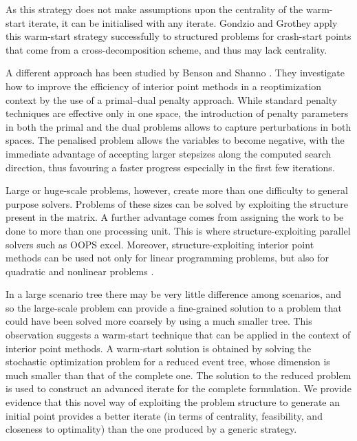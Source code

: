 {As this strategy does not make assumptions upon the centrality of the 
warm-start iterate,
it can be initialised with any iterate.
Gondzio and Grothey \cite{GondzioGrothey03} apply this warm-start 
strategy successfully to structured problems for crash-start points that 
come from a cross-decomposition scheme, and thus may lack centrality.


A different approach has been studied by Benson and Shanno 
\cite{BensonShanno}. They investigate how to improve the efficiency 
of interior point methods in a reoptimization context by the use of 
a primal--dual penalty approach.
While standard penalty techniques are effective only in one space, 
the introduction of penalty parameters in both the primal and the 
dual problems allows to capture perturbations in both spaces.
%
%
The penalised problem allows the variables to become negative, with
the immediate advantage of accepting larger stepsizes along 
the computed search direction, thus favouring a faster progress
especially in the first few iterations.


\hrulefill


Large or huge-scale problems, however, create more than one difficulty 
to general purpose solvers. Problems of these sizes can be solved by 
exploiting the structure present in the matrix. A further advantage 
comes from assigning the work to be done to more than one processing unit. 
This is where structure-exploiting parallel solvers such as OOPS 
\cite{GondzioSarkissian} excel. Moreover, structure-exploiting interior 
point methods can be used not only for linear programming problems, 
but also for quadratic and nonlinear problems \cite{GondzioGrothey04}.

In a large scenario tree there may be very little difference among 
scenarios, and so the large-scale problem can provide a fine-grained 
solution to a problem that could have been solved more coarsely by 
using a much smaller tree. This observation suggests a
warm-start technique that can be applied in the context of interior 
point methods. A warm-start solution is obtained by solving the 
stochastic optimization problem for a reduced event tree, whose 
dimension is much smaller than that of the complete one. The solution 
to the reduced problem is used to construct an advanced iterate for 
the complete formulation. We provide evidence that this novel way 
of exploiting the problem structure to generate an initial point 
provides a better iterate (in terms of centrality, feasibility, 
and closeness to optimality) than the one produced by a generic 
strategy.


}
